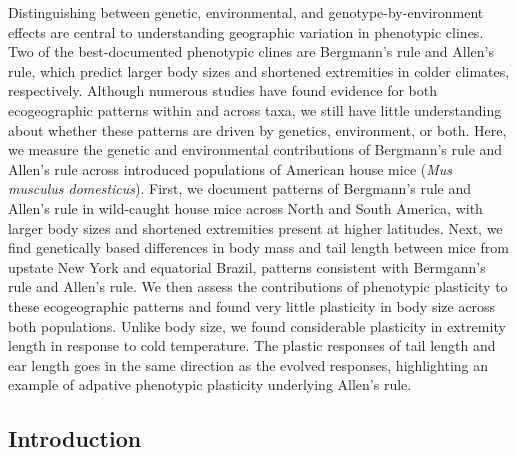 \documentclass[]{article}
\begin{document}
Distinguishing between genetic, environmental, and
genotype-by-environment effects are central to understanding geographic
variation in phenotypic clines. Two of the best-documented phenotypic
clines are Bergmann's rule and Allen's rule, which predict larger body
sizes and shortened extremities in colder climates, respectively.
Although numerous studies have found evidence for both ecogeographic
patterns within and across taxa, we still have little understanding
about whether these patterns are driven by genetics, environment, or
both. Here, we measure the genetic and environmental contributions of
Bergmann's rule and Allen's rule across introduced populations of
American house mice (\emph{Mus musculus domesticus}). First, we document
patterns of Bergmann's rule and Allen's rule in wild-caught house mice
across North and South America, with larger body sizes and shortened
extremities present at higher latitudes. Next, we find genetically based
differences in body mass and tail length between mice from upstate New
York and equatorial Brazil, patterns consistent with Bermgann's rule and
Allen's rule. We then assess the contributions of phenotypic plasticity
to these ecogeographic patterns and found very little plasticity in body
size across both populations. Unlike body size, we found considerable
plasticity in extremity length in response to cold temperature. The
plastic responses of tail length and ear length goes in the same
direction as the evolved responses, highlighting an example of adpative
phenotypic plasticity underlying Allen's rule.

\newpage

\hypertarget{introduction}{%
\subsection{Introduction}\label{introduction}}
\end{document}

